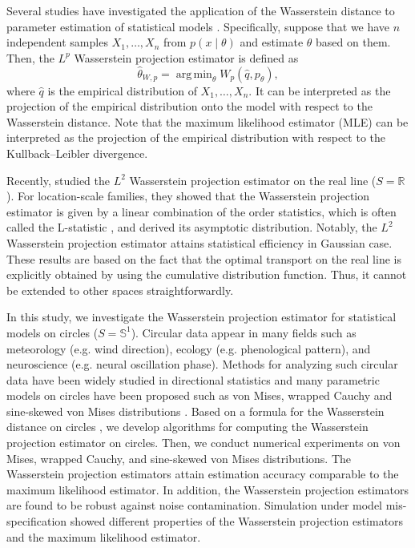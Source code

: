 \documentclass[11pt, a4paper]{article}
\DeclareMathOperator*{\argmin}{arg\,min}
\begin{document}
Several studies have investigated the application of the Wasserstein distance to parameter estimation of statistical models \citep{BBR2006,BJGR2019,FZMAP2015,MMC2015}.
Specifically, suppose that we have $n$ independent samples $X_1,\dots,X_n$ from $p(x \mid \theta)$ and estimate $\theta$ based on them.
Then, the $L^p$ Wasserstein projection estimator is defined as %
\[
\hat{\theta}_{W,p} = \argmin_{\theta} W_p (\hat{q}, p_{\theta}),
\]
where $\hat{q}$ is the empirical distribution of $X_1,\dots,X_n$.
It can be interpreted as the projection of the empirical distribution onto the model with respect to the Wasserstein distance.
Note that the maximum likelihood estimator (MLE) can be interpreted as the projection of the empirical distribution with respect to the Kullback--Leibler divergence.

Recently, \cite{AM2022} studied the $L^2$ Wasserstein projection estimator on the real line ($S=\mathbb{R}$).
For location-scale families, they showed that the Wasserstein projection estimator is given by a linear combination of the order statistics, which is often called the L-statistic \cite{vV}, and derived its asymptotic distribution.
Notably, the $L^2$ Wasserstein projection estimator attains statistical efficiency in Gaussian case.
These results are based on the fact that the optimal transport on the real line is explicitly obtained by using the cumulative distribution function.
Thus, it cannot be extended to other spaces straightforwardly.

In this study, we investigate the Wasserstein projection estimator for statistical models on circles ($S=\mathbb{S}^1$).
Circular data appear in many fields such as meteorology (e.g. wind direction), ecology (e.g. phenological pattern), and neuroscience (e.g. neural oscillation phase).
Methods for analyzing such circular data have been widely studied in directional statistics \cite{Mardia} and many parametric models on circles have been proposed such as von Mises, wrapped Cauchy and sine-skewed von Mises distributions \cite{skewed}.
Based on a formula for the Wasserstein distance on circles \cite{Delon,Rabin}, we develop algorithms for computing the Wasserstein projection estimator on circles.
Then, we conduct numerical experiments on von Mises, wrapped Cauchy, and sine-skewed von Mises distributions.
The Wasserstein projection estimators attain estimation accuracy comparable to the maximum likelihood estimator.
In addition, the Wasserstein projection estimators are found to be robust against noise contamination.
Simulation under model mis-specification showed different properties of the Wasserstein projection estimators and the maximum likelihood estimator.
\end{document}
